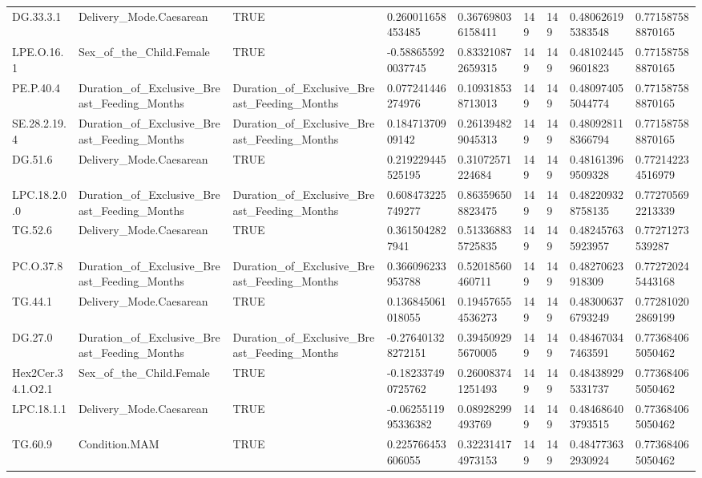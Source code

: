 \begin{longtable}{lllllllll}
DG.33.3.1 & Delivery\_Mode.Caesarean & TRUE & 0.260011658453485 & 0.367698036158411 & 149 & 149 & 0.480626195383548 & 0.771587588870165 \\
LPE.O.16.1 & Sex\_of\_the\_Child.Female & TRUE & -0.588655920037745 & 0.833210872659315 & 149 & 149 & 0.481024459601823 & 0.771587588870165 \\
PE.P.40.4 & Duration\_of\_Exclusive\_Breast\_Feeding\_Months & Duration\_of\_Exclusive\_Breast\_Feeding\_Months & 0.077241446274976 & 0.109318538713013 & 149 & 149 & 0.480974055044774 & 0.771587588870165 \\
SE.28.2.19.4 & Duration\_of\_Exclusive\_Breast\_Feeding\_Months & Duration\_of\_Exclusive\_Breast\_Feeding\_Months & 0.18471370909142 & 0.261394829045313 & 149 & 149 & 0.480928118366794 & 0.771587588870165 \\
DG.51.6 & Delivery\_Mode.Caesarean & TRUE & 0.219229445525195 & 0.31072571224684 & 149 & 149 & 0.481613969509328 & 0.772142234516979 \\
LPC.18.2.0.0 & Duration\_of\_Exclusive\_Breast\_Feeding\_Months & Duration\_of\_Exclusive\_Breast\_Feeding\_Months & 0.608473225749277 & 0.863596508823475 & 149 & 149 & 0.482209328758135 & 0.772705692213339 \\
TG.52.6 & Delivery\_Mode.Caesarean & TRUE & 0.3615042827941 & 0.513368835725835 & 149 & 149 & 0.482457635923957 & 0.77271273539287 \\
PC.O.37.8 & Duration\_of\_Exclusive\_Breast\_Feeding\_Months & Duration\_of\_Exclusive\_Breast\_Feeding\_Months & 0.366096233953788 & 0.52018560460711 & 149 & 149 & 0.48270623918309 & 0.772720245443168 \\
TG.44.1 & Delivery\_Mode.Caesarean & TRUE & 0.136845061018055 & 0.194576554536273 & 149 & 149 & 0.483006376793249 & 0.772810202869199 \\
DG.27.0 & Duration\_of\_Exclusive\_Breast\_Feeding\_Months & Duration\_of\_Exclusive\_Breast\_Feeding\_Months & -0.276401328272151 & 0.394509295670005 & 149 & 149 & 0.484670347463591 & 0.773684065050462 \\
Hex2Cer.34.1.O2.1 & Sex\_of\_the\_Child.Female & TRUE & -0.182337490725762 & 0.260083741251493 & 149 & 149 & 0.484389295331737 & 0.773684065050462 \\
LPC.18.1.1 & Delivery\_Mode.Caesarean & TRUE & -0.0625511995336382 & 0.08928299493769 & 149 & 149 & 0.484686403793515 & 0.773684065050462 \\
TG.60.9 & Condition.MAM & TRUE & 0.225766453606055 & 0.322314174973153 & 149 & 149 & 0.484773632930924 & 0.773684065050462 \\

\end{longtable}
